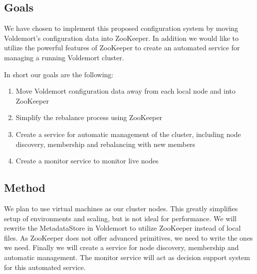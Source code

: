 \subsection{Goals}
We have chosen to implement this proposed configuration system by moving Voldemort's configuration data into ZooKeeper. In addition we would like to utilize the powerful features of ZooKeeper to create an automated service for managing a running Voldemort cluster. 


In short our goals are the following:

\begin{enumerate}
	\item{Move Voldemort configuration data away from each local node and into ZooKeeper}
	\item{Simplify the rebalance process using ZooKeeper}
	\item{Create a service for automatic management of the cluster, including node discovery, membership and rebalancing with new members}
	\item{Create a monitor service to monitor live nodes}
\end{enumerate}

\subsection{Method}
We plan to use virtual machines as our cluster nodes. This greatly simplifies setup of environments and scaling, but is not ideal for performance. We will rewrite the MetadataStore in Voldemort to utilize ZooKeeper instead of local files. As ZooKeeper does not offer advanced primitives, we need to write the ones we need. Finally we will create a service for node discovery, membership and automatic management. The monitor service will act as decision support system for this automated service. 





